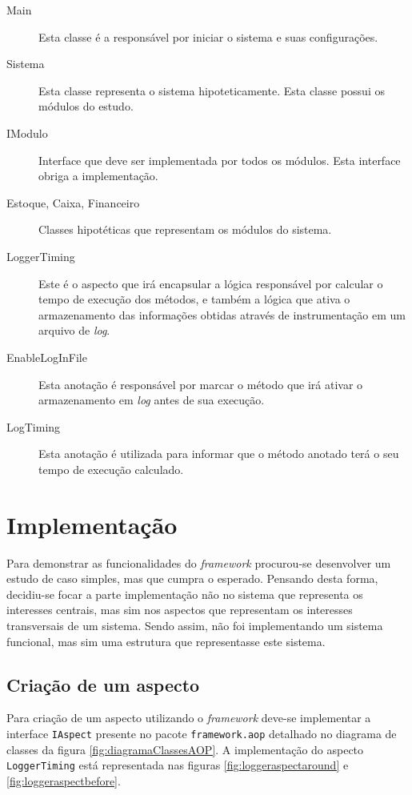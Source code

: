 \documentclass[tc,oneside]{iiufrgs}
\begin{document}
\begin{description}

\item [Main] Esta classe é a responsável por iniciar o sistema e suas configurações.
\item [Sistema] Esta classe representa o sistema hipoteticamente. Esta classe possui os módulos do estudo.
\item [IModulo] Interface que deve ser implementada por todos os módulos. Esta interface obriga a implementação.
\item [Estoque, Caixa, Financeiro] Classes hipotéticas que representam os módulos do sistema.
\item [LoggerTiming] Este é o aspecto que irá encapsular a lógica responsável por calcular o tempo de execução dos métodos, e também a lógica que ativa o armazenamento das informações obtidas através de instrumentação em um arquivo de \textit{log}.
\item [EnableLogInFile] Esta anotação é responsável por marcar o método que irá ativar o armazenamento em \textit{log} antes de sua execução.
\item[LogTiming] Esta anotação é utilizada para informar que o método anotado terá o seu tempo de execução calculado.
\end{description}

\section{Implementação}

Para demonstrar as funcionalidades do \textit{framework} procurou-se desenvolver um estudo de caso simples, mas que cumpra o esperado. Pensando desta forma, decidiu-se focar a parte implementação não no sistema que representa os interesses centrais, mas sim nos aspectos que representam os interesses transversais de um sistema. Sendo assim, não foi implementando um sistema funcional, mas sim uma estrutura que representasse este sistema.

\subsection{Criação de um aspecto}

Para criação de um aspecto utilizando o \textit{framework} deve-se implementar a interface \texttt{IAspect} presente no pacote \texttt{framework.aop} detalhado no diagrama de classes da figura \ref{fig:diagramaClassesAOP}. A implementação do aspecto \texttt{LoggerTiming} está representada nas figuras \ref{fig:loggeraspectaround} e \ref{fig:loggeraspectbefore}.
\end{document}
